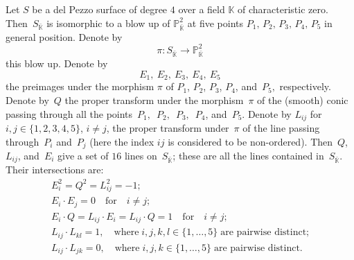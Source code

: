 \documentclass[12pt]{amsart}
\theoremstyle{definition}
\theoremstyle{remark}
\newcommand{\PP}{\mathbb{P}}
\newcommand{\KK}{\mathbb{K}}
\begin{document}
Let $S$ be a del Pezzo surface of degree $4$ over a field $\KK$ of characteristic zero.
Then~$S_{\bar{\KK}}$ is isomorphic to a blow up of $\PP^2_{\bar{\KK}}$ at five points $P_1, \, P_2, \, P_3, \, P_4, \, P_5$ in general position. Denote by
$$
\pi \colon S_{\bar{\KK}} \to \mathbb{P}^2_{\bar{\KK}}
$$
this blow up.  Denote by
$$
E_1, \ E_2, \ E_3, \ E_4, \ E_5
$$
the preimages under
the morphism $\pi$ of $P_1$, $P_2$, $P_3$, $P_4$, and~$P_5,$  respectively.
Denote by~$Q$  the proper transform under the morphism~$\pi$ of the (smooth)
conic passing through all the points~$P_1,$~$P_2,$~$P_3,$~$P_4$, and~$P_5$.
Denote by $L_{ij}$
for $i,j \in \{1,2,3,4,5\}$, $i\neq j$,
the proper transform under~$\pi$  of the line  passing through~$P_i$ and~$P_j$
(here the index $ij$ is considered to be non-ordered). 
Then~$Q$,~$L_{ij}$,  and~$E_i$ give a set of  $16$ lines on~$S_{\bar{\KK}}$;
these are all the lines contained in~$S_{\bar{\KK}}$.
Their intersections are:
\begin{gather*}
E_i^2=Q^2=L_{ij}^2=-1;  \\
E_i \cdot E_j=0 \quad \text{for} \quad  i \neq j;  \\
E_i \cdot Q=L_{ij} \cdot E_i=L_{ij} \cdot Q=1 \quad \text{for} \quad  i \neq j;  \\
L_{ij} \cdot L_{kl}=1,  \quad \text{where} \;  i,j,k,l \in \{1,\ldots,5\} \; \text{are pairwise distinct;}  \\
L_{ij} \cdot L_{jk}=0, \quad \text{where} \;  i,j,k \in \{1,\ldots,5\} \; \text{are pairwise distinct}.
\end{gather*}
\end{document}
